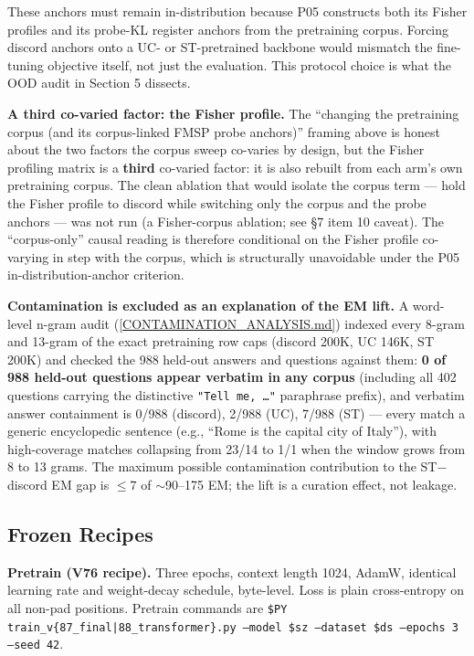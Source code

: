 \documentclass[11pt]{article}
\begin{document}
These anchors must remain in-distribution because P05 constructs both its Fisher profiles and its probe-KL register anchors from the pretraining corpus. Forcing discord anchors onto a UC- or ST-pretrained backbone would mismatch the fine-tuning objective itself, not just the evaluation. This protocol choice is what the OOD audit in Section 5 dissects.

\textbf{A third co-varied factor: the Fisher profile.} The ``changing the pretraining corpus (and its corpus-linked FMSP probe anchors)'' framing above is honest about the two factors the corpus sweep co-varies by design, but the Fisher profiling matrix is a \textbf{third} co-varied factor: it is also rebuilt from each arm's own pretraining corpus. The clean ablation that would isolate the corpus term --- hold the Fisher profile to discord while switching only the corpus and the probe anchors --- was not run (a Fisher-corpus ablation; see \S7 item 10 caveat). The ``corpus-only'' causal reading is therefore conditional on the Fisher profile co-varying in step with the corpus, which is structurally unavoidable under the P05 in-distribution-anchor criterion.

\textbf{Contamination is excluded as an explanation of the EM lift.} A word-level n-gram audit (\href{https://github.com/llaa33219/MicroMixer-4/blob/4bb630413dfa58ef3141291e121ab8c006d03235/CONTAMINATION_ANALYSIS.md}{[CONTAMINATION\_ANALYSIS.md]}) indexed every 8-gram and 13-gram of the exact pretraining row caps (discord 200K, UC 146K, ST 200K) and checked the 988 held-out answers and questions against them: \textbf{0 of 988 held-out questions appear verbatim in any corpus} (including all 402 questions carrying the distinctive \texttt{"Tell me, \dots"} paraphrase prefix), and verbatim answer containment is 0/988 (discord), 2/988 (UC), 7/988 (ST) --- every match a generic encyclopedic sentence (e.g., ``Rome is the capital city of Italy''), with high-coverage matches collapsing from 23/14 to 1/1 when the window grows from 8 to 13 grams. The maximum possible contamination contribution to the ST$-$discord EM gap is $\leq 7$ of $\sim$90--175 EM; the lift is a curation effect, not leakage.

\subsection{Frozen Recipes}

\textbf{Pretrain (V76 recipe).} Three epochs, context length 1024, AdamW, identical learning rate and weight-decay schedule, byte-level. Loss is plain cross-entropy on all non-pad positions. Pretrain commands are \texttt{\$PY train\_v\{87\_final|88\_transformer\}.py --model \$sz --dataset \$ds --epochs 3 --seed 42}.
\end{document}
